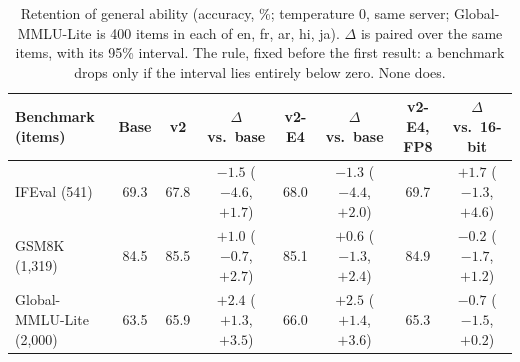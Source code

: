 \documentclass[11pt]{article}
\begin{document}
\begin{table}[t]
\centering
\footnotesize
\setlength{\tabcolsep}{3pt}
\begin{tabular}{@{}lccccccc@{}}
\toprule
\textbf{Benchmark (items)} & \textbf{Base} & \textbf{v2} & \textbf{$\Delta$ vs.\ base} & \textbf{v2-E4} & \textbf{$\Delta$ vs.\ base} & \textbf{v2-E4, FP8} & \textbf{$\Delta$ vs.\ 16-bit} \\
\midrule
IFEval (541) & 69.3 & 67.8 & $-1.5$ ($-4.6$, $+1.7$) & 68.0 & $-1.3$ ($-4.4$, $+2.0$) & 69.7 & $+1.7$ ($-1.3$, $+4.6$) \\
GSM8K (1,319) & 84.5 & 85.5 & $+1.0$ ($-0.7$, $+2.7$) & 85.1 & $+0.6$ ($-1.3$, $+2.4$) & 84.9 & $-0.2$ ($-1.7$, $+1.2$) \\
Global-MMLU-Lite (2,000) & 63.5 & 65.9 & $+2.4$ ($+1.3$, $+3.5$) & 66.0 & $+2.5$ ($+1.4$, $+3.6$) & 65.3 & $-0.7$ ($-1.5$, $+0.2$) \\
\bottomrule
\end{tabular}
\caption{Retention of general ability (accuracy, \%; temperature 0, same server; Global-MMLU-Lite is 400 items in each of en, fr, ar, hi, ja). $\Delta$ is paired over the same items, with its 95\% interval. The rule, fixed before the first result: a benchmark drops only if the interval lies entirely below zero. None does.}
\label{tab:retention}
\end{table}
\end{document}
